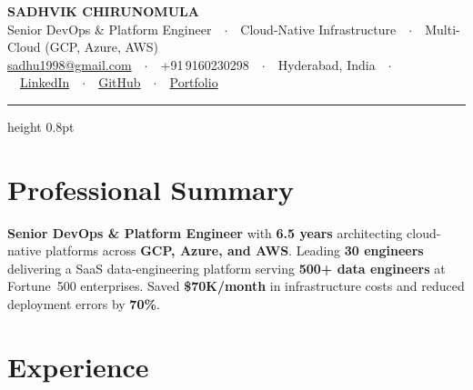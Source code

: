 \documentclass[10pt, letterpaper]{article}
\begin{document}

\begin{center}
  {\fontsize{19pt}{22pt}\selectfont\textbf{SADHVIK CHIRUNOMULA}}\\[3pt]
  {\small\color{mid}Senior DevOps \& Platform Engineer\ \ $\cdot$\ \ Cloud-Native Infrastructure\ \ $\cdot$\ \ Multi-Cloud (GCP, Azure, AWS)}\\[4pt]
  {\footnotesize
    \href{mailto:sadhu1998@gmail.com}{sadhu1998@gmail.com}\ \ $\cdot$\ \
    +91\,9160230298\ \ $\cdot$\ \
    Hyderabad, India\ \ $\cdot$\ \
    \href{https://www.linkedin.com/in/sadhvik-chirunomula-080064170/}{LinkedIn}\ \ $\cdot$\ \
    \href{https://github.com/SadhvikChirunomula}{GitHub}\ \ $\cdot$\ \
    \href{https://sadhvikchirunomula.github.io/}{Portfolio}
  }
\end{center}
\vspace{-2pt}
{\color{dark}\hrule height 0.8pt}
\vspace{3pt}

\section{Professional Summary}
{\small \textbf{Senior DevOps \& Platform Engineer} with \textbf{6.5 years} architecting cloud-native
platforms across \textbf{GCP, Azure, and AWS}. Leading \textbf{30 engineers} delivering a SaaS
data-engineering platform serving \textbf{500+ data engineers} at Fortune~500 enterprises.
Saved \textbf{\$70K/month} in infrastructure costs and reduced deployment errors by \textbf{70\%}.}

\section{Experience}
\end{document}
